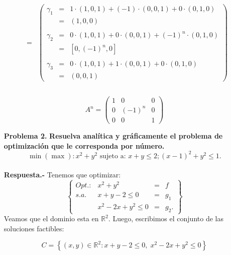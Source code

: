 \begin{enumerate}
$$\begin{array}{rcl}
	&=&
	\left(\begin{array}{rcl}
	    \gamma_1 &=& 1\cdot(1,0,1)+(-1)\cdot(0,0,1)+0\cdot(0,1,0)\\
		     &=&(1,0,0)\\\\
	    \gamma_2 &=& 0\cdot(1,0,1)+0\cdot(0,0,1)+(-1)^n\cdot(0,1,0)\\
		     &=&\left[0,(-1)^n,0\right]\\\\
	    \gamma_3 &=& 0\cdot(1,0,1)+1\cdot(0,0,1)+0\cdot(0,1,0)\\
		     &=&(0,0,1)
	\end{array}\right)\\\\
    \end{array}$$
    
    \begin{tcolorbox}
	$$A^n = \left(\begin{array}{*{3}{r}}
	    1 & 0 & 0 \\
	    0 & (-1)^n & 0 \\
	    0 & 0 & 1
	\end{array}\right)$$
    \end{tcolorbox}
    \vspace{1cm}



    \item [\bfseries Problema 2.] \textbf{\boldmath Resuelva analítica y gráficamente el problema de optimización que le corresponda por número.
    $$\min(\max):x^2+y^2\mbox{ sujeto a: } x+y\leq 2; (x-1)^2+y^2\leq 1.$$\\
	Respuesta.-\;} Tenemos que optimizar:
	$$\left\{\begin{array}{llll}
		Opt.: & x^2+y^2&=&f\\
		s.a. & x+y-2\leq 0&=&g_1\\
		     & x^2-2x+y^2\leq 0&=&g_2.
	\end{array}\right\}$$
	Veamos que el dominio esta en $\mathbb{R}^2$. Luego, escribimos el conjunto de las soluciones factibles:
	\begin{tcolorbox}
	$$C=\left\{(x,y)\in \mathbb{R}^2:x+y-2\leq 0, \; x^2-2x+y^2\leq 0\right\}$$
	\end{tcolorbox}


\end{enumerate}

